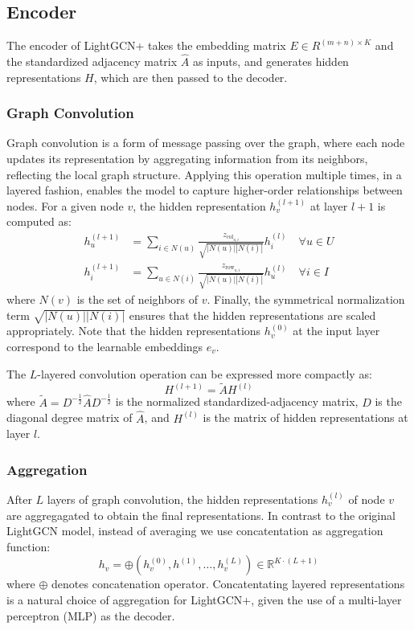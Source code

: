 \documentclass[10pt,conference,compsocconf]{IEEEtran}
\begin{document}
\subsection{Encoder}
The encoder of LightGCN+ takes the embedding matrix $E \in R^{(m+n)\times K}$ and the standardized adjacency matrix \(\hat{A}\) as inputs, and generates hidden representations $H$, which are then passed to the decoder.

\subsubsection{Graph Convolution}
Graph convolution is a form of message passing over the graph, where each node updates its representation by aggregating information from its neighbors, reflecting the local graph structure. 
Applying this operation multiple times, in a layered fashion, enables the model to capture higher-order relationships between nodes.
For a given node $v$, the hidden representation $h_v^{(l+1)}$ at layer $l+1$ is computed as:
\begin{align}
    h_u^{(l+1)} &= \sum_{i \in N(u)} \frac{z_{\text{col}_{u,i}}}{\sqrt{|N(u)||N(i)|}} h_i^{(l)} \quad \forall u \in U \\
    h_i^{(l+1)} &= \sum_{u \in N(i)} \frac{z_{\text{row}_{u,i}}}{\sqrt{|N(u)||N(i)|}} h_u^{(l)}  \quad \forall i \in I
\end{align}
where $N(v)$ is the set of neighbors of $v$.
Finally, the symmetrical normalization term $\sqrt{|N(u)||N(i)|}$ ensures that the hidden representations are scaled appropriately.
Note that the hidden representations $h_v^{(0)}$ at the input layer correspond to the learnable embeddings $e_v$.

The $L$-layered convolution operation can be expressed more compactly as:
\begin{equation}
    H^{(l+1)} = \tilde{A} H^{(l)}
\end{equation}
where $\tilde{A} = D^{-\frac{1}{2}} \hat{A} D^{-\frac{1}{2}}$ is the normalized standardized-adjacency matrix, $D$ is the diagonal degree matrix of $\hat{A}$, and $H^{(l)}$ is the matrix of hidden representations at layer $l$.

\subsubsection{Aggregation}
After $L$ layers of graph convolution, the hidden representations $h_v^{(l)}$ of node $v$ are aggregagated to obtain the final representations.
In contrast to the original LightGCN model, instead of averaging we use concatentation as aggregation function:
\begin{equation}
    h_v = \oplus(h_v^{(0)}, h^{(1)}, \ldots, h_v^{(L)}) \in \mathbb{R}^{K \cdot (L+1)}
\end{equation}
where $\oplus$ denotes concatenation operator.
Concatentating layered representations is a natural choice of aggregation for LightGCN+, given the use of a multi-layer perceptron (MLP) as the decoder.
\end{document}
